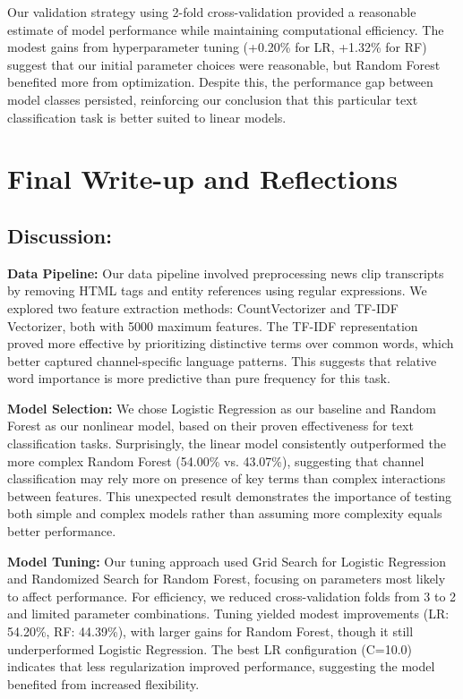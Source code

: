 \documentclass[11pt]{article}
\begin{document}
Our validation strategy using 2-fold cross-validation provided a reasonable estimate of model performance while maintaining computational efficiency. The modest gains from hyperparameter tuning (+0.20\% for LR, +1.32\% for RF) suggest that our initial parameter choices were reasonable, but Random Forest benefited more from optimization. Despite this, the performance gap between model classes persisted, reinforcing our conclusion that this particular text classification task is better suited to linear models.

\section{Final Write-up and Reflections}

\subsection{Discussion:} 

\textbf{Data Pipeline:} Our data pipeline involved preprocessing news clip transcripts by removing HTML tags and entity references using regular expressions. We explored two feature extraction methods: CountVectorizer and TF-IDF Vectorizer, both with 5000 maximum features. The TF-IDF representation proved more effective by prioritizing distinctive terms over common words, which better captured channel-specific language patterns. This suggests that relative word importance is more predictive than pure frequency for this task.

\textbf{Model Selection:} We chose Logistic Regression as our baseline and Random Forest as our nonlinear model, based on their proven effectiveness for text classification tasks. Surprisingly, the linear model consistently outperformed the more complex Random Forest (54.00\% vs. 43.07\%), suggesting that channel classification may rely more on presence of key terms than complex interactions between features. This unexpected result demonstrates the importance of testing both simple and complex models rather than assuming more complexity equals better performance.

\textbf{Model Tuning:} Our tuning approach used Grid Search for Logistic Regression and Randomized Search for Random Forest, focusing on parameters most likely to affect performance. For efficiency, we reduced cross-validation folds from 3 to 2 and limited parameter combinations. Tuning yielded modest improvements (LR: 54.20\%, RF: 44.39\%), with larger gains for Random Forest, though it still underperformed Logistic Regression. The best LR configuration (C=10.0) indicates that less regularization improved performance, suggesting the model benefited from increased flexibility.
\end{document}
